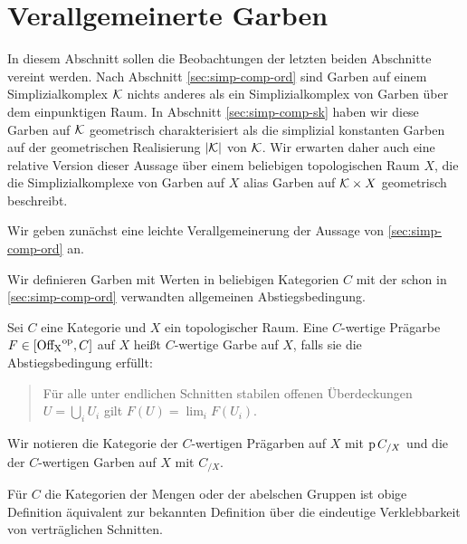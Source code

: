 
\section{Verallgemeinerte Garben}
\label{sec:gen-sheaves}

In diesem Abschnitt sollen die Beobachtungen der letzten beiden
Abschnitte vereint werden. Nach Abschnitt \ref{sec:simp-comp-ord} sind
Garben auf einem Simplizialkomplex $\mathcal{K}$ nichts anderes als ein
Simplizialkomplex von Garben über dem einpunktigen Raum. In Abschnitt
\ref{sec:simp-comp-sk} haben wir diese Garben auf $\mathcal{K}$ geometrisch
charakterisiert als die simplizial konstanten Garben auf der
geometrischen Realisierung $|\mathcal{K}|$ von $\mathcal{K}$. Wir erwarten daher auch
eine relative Version dieser Aussage über einem beliebigen
topologischen Raum $X$, die die Simplizialkomplexe von Garben auf $X$
alias Garben auf $\mathcal{K} \times X$ geometrisch beschreibt.

Wir geben zunächst eine leichte Verallgemeinerung der Aussage von
\ref{sec:simp-comp-ord} an.

Wir definieren Garben mit Werten in beliebigen Kategorien $C$ mit der
schon in \ref{sec:simp-comp-ord} verwandten allgemeinen
Abstiegsbedingung.
\begin{defn}[\cite{TG}, 2.1.5]
  Sei $C$ eine Kategorie und $X$ ein topologischer Raum. Eine
  $C$-wertige Prägarbe $F \in [\operatorname{Off_X}^\mathrm{op}, C]$ auf $X$ heißt $C$-wertige
  Garbe auf $X$, falls sie die Abstiegsbedingung erfüllt:
  \begin{quote}
    Für alle unter endlichen Schnitten stabilen offenen Überdeckungen
    $U = \bigcup_i U_i$ gilt $F(U) = \lim_i F(U_i)$.
  \end{quote}
\end{defn}
Wir notieren die Kategorie der $C$-wertigen Prägarben auf $X$ mit $\operatorname{p}
C_{/X}$ und die der $C$-wertigen Garben auf $X$ mit $C_{/X}$.

Für $C$ die Kategorien der Mengen oder der abelschen Gruppen ist obige
Definition äquivalent zur bekannten Definition über die eindeutige
Verklebbarkeit von verträglichen Schnitten.

